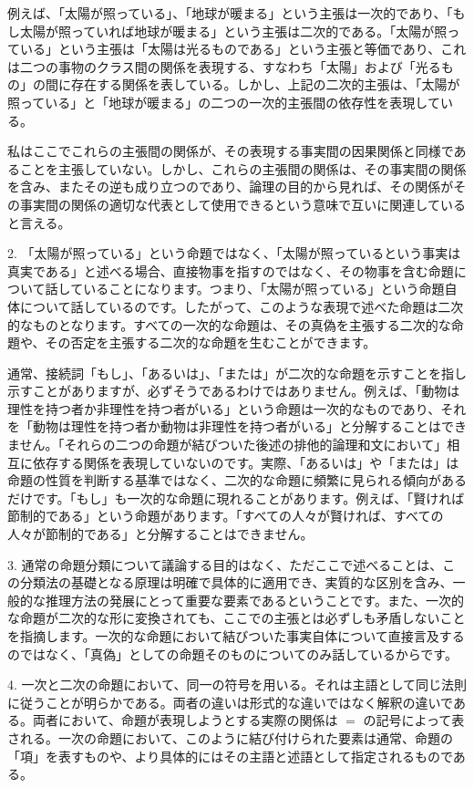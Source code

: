 \documentclass[a4paper,11pt,openany]{ltjsbook}
\begin{document}
例えば、「太陽が照っている」、「地球が暖まる」という主張は一次的であり、「もし太陽が照っていれば地球が暖まる」という主張は二次的である。「太陽が照っている」という主張は「太陽は光るものである」という主張と等価であり、これは二つの事物のクラス間の関係を表現する、すなわち「太陽」および「光るもの」の間に存在する関係を表している。しかし、上記の二次的主張は、「太陽が照っている」と「地球が暖まる」の二つの一次的主張間の依存性を表現している。

私はここでこれらの主張間の関係が、その表現する事実間の因果関係と同様であることを主張していない。しかし、これらの主張間の関係は、その事実間の関係を含み、またその逆も成り立つのであり、論理の目的から見れば、その関係がその事実間の関係の適切な代表として使用できるという意味で互いに関連していると言える。

2. 「太陽が照っている」という命題ではなく、「太陽が照っているという事実は真実である」と述べる場合、直接物事を指すのではなく、その物事を含む命題について話していることになります。つまり、「太陽が照っている」という命題自体について話しているのです。したがって、このような表現で述べた命題は二次的なものとなります。すべての一次的な命題は、その真偽を主張する二次的な命題や、その否定を主張する二次的な命題を生むことができます。

通常、接続詞「もし」、「あるいは」、「または」が二次的な命題を示すことを指し示すことがありますが、必ずそうであるわけではありません。例えば、「動物は理性を持つ者か非理性を持つ者がいる」という命題は一次的なものであり、それを「動物は理性を持つ者か動物は非理性を持つ者がいる」と分解することはできません。「それらの二つの命題が結びついた後述の排他的論理和文において」相互に依存する関係を表現していないのです。実際、「あるいは」や「または」は命題の性質を判断する基準ではなく、二次的な命題に頻繁に見られる傾向があるだけです。「もし」も一次的な命題に現れることがあります。例えば、「賢ければ節制的である」という命題があります。「すべての人々が賢ければ、すべての人々が節制的である」と分解することはできません。

3. 通常の命題分類について議論する目的はなく、ただここで述べることは、この分類法の基礎となる原理は明確で具体的に適用でき、実質的な区別を含み、一般的な推理方法の発展にとって重要な要素であるということです。また、一次的な命題が二次的な形に変換されても、ここでの主張とは必ずしも矛盾しないことを指摘します。一次的な命題において結びついた事実自体について直接言及するのではなく、「真偽」としての命題そのものについてのみ話しているからです。

4. 一次と二次の命題において、同一の符号を用いる。それは主語として同じ法則に従うことが明らかである。両者の違いは形式的な違いではなく解釈の違いである。両者において、命題が表現しようとする実際の関係は $=$ の記号によって表される。一次の命題において、このように結び付けられた要素は通常、命題の「項」を表すものや、より具体的にはその主語と述語として指定されるものである。
\end{document}
